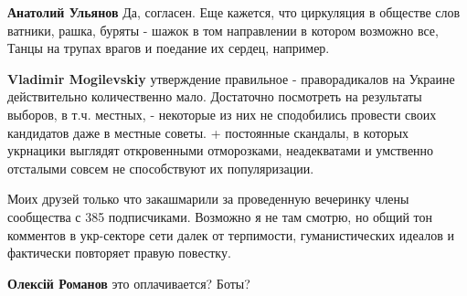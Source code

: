 \begin{itemize}
\begin{itemize}
 
\textbf{Анатолий Ульянов} Да, согласен. Еще кажется, что циркуляция в обществе
слов ватники, рашка, буряты - шажок в том направлении в котором возможно все,
Танцы на трупах врагов и поедание их сердец, например.

 
\textbf{Vladimir Mogilevskiy} утверждение правильное - праворадикалов на
Украине действительно количественно мало. Достаточно посмотреть на результаты
выборов, в т.ч. местных, - некоторые из них не сподобились провести своих
кандидатов даже в местные советы. + постоянные скандалы, в которых укрнацики
выглядят откровенными отморозками, неадекватами и умственно отсталыми совсем не
способствуют их популяризации.

 

Моих друзей только что закашмарили за проведенную вечеринку члены сообщества с
385 подписчиками. Возможно я не там смотрю, но общий тон комментов в
укр-секторе сети далек от терпимости, гуманистических идеалов и фактически
повторяет правую повестку.


 
\textbf{Олексій Романов} это оплачивается? Боты?

 

\end{itemize}
\end{itemize}
